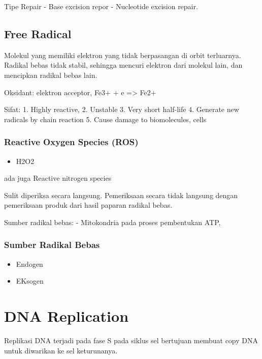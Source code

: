 \documentclass[
  letterpaper,
  DIV=11,
  numbers=noendperiod]{scrreprt}
\providecommand{\tightlist}{%
  \setlength{\itemsep}{0pt}\setlength{\parskip}{0pt}}\usepackage{longtable,booktabs,array}
\begin{document}
Tipe Repair - Base excision repor - Nucleotide excision repair.

\subsection{Free Radical}\label{free-radical}

Molekul yang memiliki elektron yang tidak berpasangan di orbit
terluarnya. Radikal bebas tidak stabil, sehingga mencuri elektron dari
molekul lain, dan mencipkan radikal bebas lain.

Oksidant: elektron acceptor, Fe3+ + e =\textgreater{} Fe2+

Sifat: 1. Highly reactive, 2. Unstable 3. Very short half-life 4.
Generate new radicals by chain reaction 5. Cause damage to biomolecules,
cells

\subsubsection{Reactive Oxygen Species
(ROS)}\label{reactive-oxygen-species-ros}

\begin{itemize}
\tightlist
\item
  H2O2
\end{itemize}

ada juga Reactive nitrogen species

Sulit diperiksa secara langsung. Pemeriksaan secara tidak langsung
dengan pemeriksaan produk dari hasil paparan radikal bebas.

Sumber radikal bebas: - Mitokondria pada proses pembentukan ATP,

\subsubsection{Sumber Radikal Bebas}\label{sumber-radikal-bebas}

\begin{itemize}
\tightlist
\item
  Endogen
\item
  EKsogen
\end{itemize}

\section{DNA Replication}\label{dna-replication}

Replikasi DNA terjadi pada fase S pada siklus sel bertujuan membuat copy
DNA untuk diwarikan ke sel keturunanya.
\end{document}
